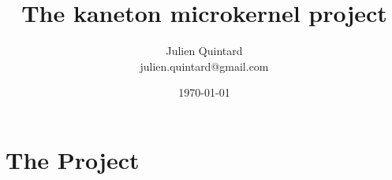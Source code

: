 \documentclass[10pt,a4wide]{article}
\title{The kaneton microkernel project}
\author{\small{Julien Quintard} \\
        \scriptsize{julien.quintard@gmail.com}}
\date{\scriptsize{\today}}
\begin{document}
\maketitle


\begin{abstract}

\end{abstract}

%
%



\section{The Project}
\end{document}
